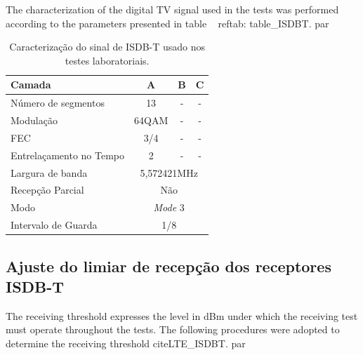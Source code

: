 The characterization of the digital TV signal used in the tests was performed according to the parameters presented in table ~ ref{tab: table_ISDBT}. par

\begin{table}[h!]
	\begin{center}
		\centering
		\caption{Caracterização do sinal de ISDB-T usado nos testes laboratoriais.}
		\label{tab:table_ISDBT}
		\begin{tabular}{|l|c|c|c|}
			\hline
			\textbf{Camada} & \textbf{A} & \textbf{B} & \textbf{C}\\
			\hline
			Número de segmentos & 13 & - & -\\
			\hline
			Modulação & 64QAM & - & -\\
			\hline
			FEC & 3/4 & - & -\\
			\hline
			Entrelaçamento no Tempo & 2 & - & -\\
			\hline
			Largura de banda &\multicolumn{3}{c|}{5,572421MHz}\\
			\hline
			Recepção Parcial &\multicolumn{3}{c|}{Não}\\
			\hline
			Modo &\multicolumn{3}{c|}{\textit{Mode} 3}\\
			\hline
		    Intervalo de Guarda &\multicolumn{3}{c|}{1/8}\\
			\hline
		\end{tabular}
	\end{center}
\end{table}

\subsection {Ajuste do limiar de recepção dos receptores ISDB-T}

The receiving threshold expresses the level in dBm under which the receiving test must operate throughout the tests. The following procedures were adopted to determine the receiving threshold cite{LTE_ISDBT}. par


